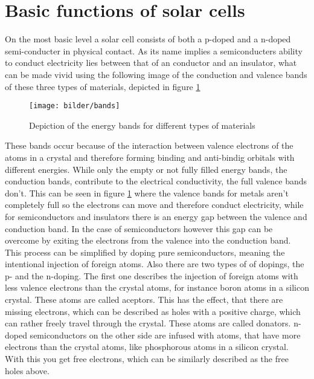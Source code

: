 \section{Basic functions of solar cells}
On the most basic level a solar cell consists of both a p-doped and a n-doped semi-conducter in physical contact. \newline
As its name implies a semiconducters ability to conduct electricity lies between that of an conductor and an insulator, what can be made vivid using the following image of the conduction and valence bands of these three types of materials, depicted in figure \ref{fig:bands}
\begin{figure}[h]
	\centering
	\texttt{[image: bilder/bands]}
	\caption{Depiction of the energy bands for different types of materials}
	\label{fig:bands}
\end{figure}
These bands occur because of the interaction between valence electrons of the atoms in a crystal and therefore forming binding and anti-bindig orbitals with different energies. \newline
While only the empty or not fully filled energy bands, the conduction bands, contribute to the electrical conductivity, the full valence bands don't. \newline
This can be seen in figure \ref{fig:bands} where the valence bands for metals aren't completely full so the electrons can move and therefore conduct electricity, while for semiconductors and insulators there is an energy gap  between the valence and conduction band. In the case of semiconductors however this gap can be overcome by exiting the electrons from the valence into the conduction band. \newline
This process can be simplified by doping pure semiconductors, meaning the intentional injection of foreign atoms. Also there are two types of of dopings, the p- and the n-doping. The first one describes the injection of foreign atoms with less valence electrons than the crystal atoms, for instance boron atoms in a silicon crystal. These atoms are called aceptors. This has the effect, that there are missing electrons, which can be described as holes with a positive charge, which can rather freely travel through the crystal. These atoms are called donators. \newline
n-doped semiconductors on the other side are infused with atoms, that have more electrons than the crystal atoms, like phosphorous atoms in a silicon crystal. With this you get free electrons, which can be similarly described as the free holes above. \newline
